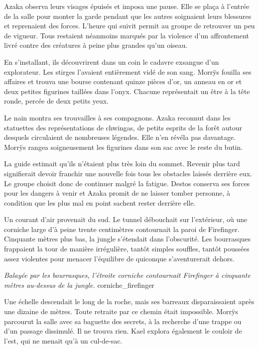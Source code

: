 \scenebreak

Azaka observa leurs visages épuisés et imposa une pause. Elle se plaça à l'entrée de la salle pour monter la garde pendant que les autres soignaient leurs blessures et reprenaient des forces. L'heure qui suivit permit au groupe de retrouver un peu de vigueur. Tous restaient néanmoins marqués par la violence d'un affrontement livré contre des créatures à peine plus grandes qu'un oiseau.

En s'installant, ils découvrirent dans un coin le cadavre exsangue d'un explorateur. Les stirges l'avaient entièrement vidé de son sang. Morrÿs fouilla ses affaires et trouva une bourse contenant quinze pièces d'or, un anneau en or et deux petites figurines taillées dans l'onyx. Chacune représentait un être à la tête ronde, percée de deux petits yeux.

Le nain montra ses trouvailles à ses compagnons. Azaka reconnut dans les statuettes des représentations de chwingas, de petits esprits de la forêt autour desquels circulaient de nombreuses légendes. Elle n'en révéla pas davantage. Morrÿs rangea soigneusement les figurines dans son sac avec le reste du butin.

La guide estimait qu'ils n'étaient plus très loin du sommet. Revenir plus tard signifierait devoir franchir une nouvelle fois tous les obstacles laissés derrière eux. Le groupe choisit donc de continuer malgré la fatigue. Destos conserva ses forces pour les dangers à venir et Azaka promit de ne laisser tomber personne, à condition que les plus mal en point sachent rester derrière elle.

\scenebreak

Un courant d'air provenait du sud. Le tunnel débouchait sur l'extérieur, où une corniche large d'à peine trente centimètres contournait la paroi de Firefinger. Cinquante mètres plus bas, la jungle s'étendait dans l'obscurité. Les bourrasques frappaient la tour de manière irrégulière, tantôt simples souffles, tantôt poussées assez violentes pour menacer l'équilibre de quiconque s'aventurerait dehors.

{\textit{Balayée par les bourrasques, l'étroite corniche contournait Firefinger à cinquante mètres au-dessus de la jungle.}}
{corniche_firefinger}

Une échelle descendait le long de la roche, mais ses barreaux disparaissaient après une dizaine de mètres. Toute retraite par ce chemin était impossible. Morrÿs parcourut la salle avec sa baguette des secrets, à la recherche d'une trappe ou d'un passage dissimulé. Il ne trouva rien. Kael explora également le couloir de l'est, qui ne menait qu'à un cul-de-sac.

